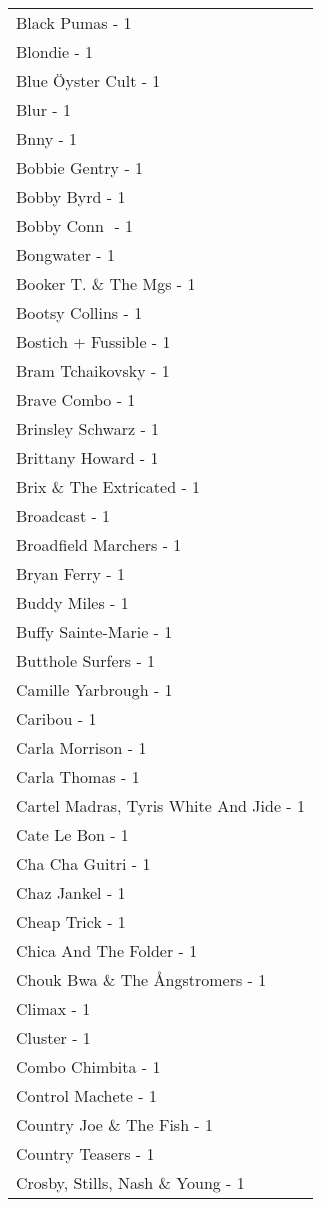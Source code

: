 \documentclass[
]{article}
\begin{document}
\begin{longtable}{l}
Black Pumas - 1 \\ 
Blondie - 1 \\ 
Blue Öyster Cult - 1 \\ 
Blur - 1 \\ 
Bnny - 1 \\ 
Bobbie Gentry - 1 \\ 
Bobby Byrd - 1 \\ 
Bobby Conn ‎ - 1 \\ 
Bongwater - 1 \\ 
Booker T. \& The Mgs - 1 \\ 
Bootsy Collins - 1 \\ 
Bostich + Fussible - 1 \\ 
Bram Tchaikovsky - 1 \\ 
Brave Combo - 1 \\ 
Brinsley Schwarz - 1 \\ 
Brittany Howard - 1 \\ 
Brix \& The Extricated - 1 \\ 
Broadcast - 1 \\ 
Broadfield Marchers - 1 \\ 
Bryan Ferry - 1 \\ 
Buddy Miles - 1 \\ 
Buffy Sainte-Marie - 1 \\ 
Butthole Surfers - 1 \\ 
Camille Yarbrough - 1 \\ 
Caribou - 1 \\ 
Carla Morrison - 1 \\ 
Carla Thomas - 1 \\ 
Cartel Madras, Tyris White And Jide - 1 \\ 
Cate Le Bon - 1 \\ 
Cha Cha Guitri - 1 \\ 
Chaz Jankel - 1 \\ 
Cheap Trick - 1 \\ 
Chica And The Folder - 1 \\ 
Chouk Bwa \& The Ångstromers - 1 \\ 
Climax - 1 \\ 
Cluster - 1 \\ 
Combo Chimbita - 1 \\ 
Control Machete - 1 \\ 
Country Joe \& The Fish - 1 \\ 
Country Teasers - 1 \\ 
Crosby, Stills, Nash \& Young - 1 \\ 

\end{longtable}
\end{document}
